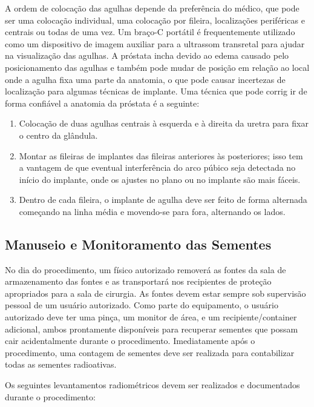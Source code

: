 \documentclass[11pt,a4paper]{article}
\begin{document}
	A ordem de colocação das agulhas depende da preferência do médico, que pode ser uma colocação individual, uma colocação por fileira, localizações periféricas e centrais ou todas de uma vez. Um braço-C portátil é frequentemente utilizado como um dispositivo de imagem auxiliar para a ultrassom transretal para ajudar na visualização das agulhas. A próstata incha devido ao edema causado pelo posicionamento das agulhas e também pode mudar de posição em relação ao local onde a agulha fixa uma parte da anatomia, o que pode causar incertezas de localização para algumas técnicas de implante. Uma técnica que pode corrig
	ir de forma confiável a anatomia da próstata é a seguinte:

	\begin{enumerate}[label=\textcolor{CarnationPink}{\arabic*${}^\circ$}]
		\item Colocação de duas agulhas centrais à esquerda e à direita da uretra para fixar o centro da glândula.
		\item Montar as fileiras de implantes das fileiras anteriores às posteriores; isso tem a vantagem de que eventual interferência do arco púbico seja detectada no início do implante, onde os ajustes no plano ou no implante são mais fáceis.
		\item Dentro de cada fileira, o implante de agulha deve ser feito de forma alternada começando na linha média e movendo-se para fora, alternando os lados.
	\end{enumerate}

\subsection*{Manuseio e Monitoramento das Sementes}

	No dia do procedimento, um físico autorizado removerá as fontes da sala de armazenamento das fontes e as transportará nos recipientes de proteção apropriados para a sala de cirurgia. As fontes devem estar sempre sob supervisão pessoal de um usuário autorizado. Como parte do equipamento, o usuário autorizado deve ter uma pinça, um monitor de área, e um recipiente/container adicional, ambos prontamente disponíveis para recuperar sementes que possam cair acidentalmente durante o procedimento. Imediatamente após o procedimento, uma contagem de sementes deve ser realizada para contabilizar todas as sementes radioativas.

		Os seguintes levantamentos radiométricos devem ser realizados e documentados durante o procedimento:
\end{document}
